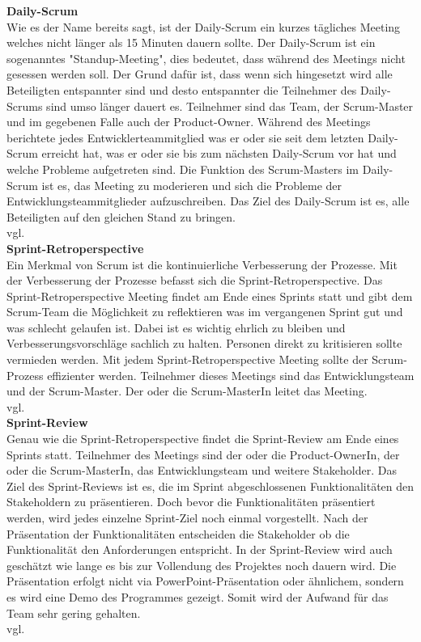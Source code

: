 		\textbf{Daily-Scrum} \\
		Wie es der Name bereits sagt, ist der Daily-Scrum ein kurzes tägliches Meeting welches nicht länger als 15 Minuten dauern sollte. Der Daily-Scrum ist ein sogenanntes "Standup-Meeting", dies bedeutet, dass während des Meetings nicht gesessen werden soll. Der Grund dafür ist, dass wenn sich hingesetzt wird alle Beteiligten entspannter sind und desto entspannter die Teilnehmer des Daily-Scrums sind umso länger dauert es. 
		Teilnehmer sind das Team, der Scrum-Master und im gegebenen Falle auch der Product-Owner. Während des Meetings berichtete jedes Entwicklerteammitglied was er oder sie seit dem letzten Daily-Scrum erreicht hat, was er oder sie bis zum nächsten Daily-Scrum vor hat und welche Probleme aufgetreten sind. Die Funktion des Scrum-Masters im Daily-Scrum ist es, das Meeting zu moderieren und sich die Probleme der Entwicklungsteammitglieder aufzuschreiben.
		Das Ziel des Daily-Scrum ist es, alle Beteiligten auf den gleichen Stand zu bringen.\\vgl. \textcite{ScrumDailyScrum} \\
		
		\textbf{Sprint-Retroperspective} \\
		Ein Merkmal von Scrum ist die kontinuierliche Verbesserung der Prozesse. Mit der Verbesserung der Prozesse befasst sich die Sprint-Retroperspective. Das Sprint-Retroperspective Meeting findet am Ende eines Sprints statt und gibt dem Scrum-Team die Möglichkeit zu reflektieren was im vergangenen Sprint gut und was schlecht gelaufen ist. Dabei ist es wichtig ehrlich zu bleiben und Verbesserungsvorschläge sachlich zu halten. Personen direkt zu kritisieren sollte vermieden werden. Mit jedem Sprint-Retroperspective Meeting sollte der Scrum-Prozess effizienter werden. 
		Teilnehmer dieses Meetings sind das Entwicklungsteam und der Scrum-Master. Der oder die Scrum-MasterIn leitet das Meeting.\\vgl. \textcite{ScrumScrum-Retroperspective} \\
		
		\textbf{Sprint-Review} \\
		Genau wie die Sprint-Retroperspective findet die Sprint-Review am Ende eines Sprints statt. Teilnehmer des Meetings sind der oder die Product-OwnerIn, der oder die Scrum-MasterIn, das Entwicklungsteam und weitere Stakeholder. Das Ziel des Sprint-Reviews ist es, die im Sprint abgeschlossenen Funktionalitäten den Stakeholdern zu präsentieren. Doch bevor die Funktionalitäten präsentiert werden, wird jedes einzelne Sprint-Ziel noch einmal vorgestellt. Nach der Präsentation der Funktionalitäten entscheiden die Stakeholder ob die Funktionalität den Anforderungen entspricht. In der Sprint-Review wird auch geschätzt wie lange es bis zur Vollendung des Projektes noch dauern wird.
		Die Präsentation erfolgt nicht via PowerPoint-Präsentation oder ähnlichem, sondern es wird eine Demo des Programmes gezeigt. Somit wird der Aufwand für das Team sehr gering gehalten.\\vgl. \textcite{ScrumScrum-Review} \\
		
